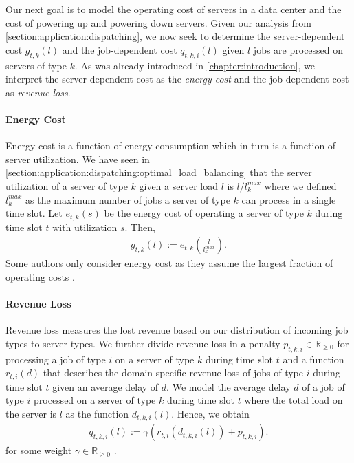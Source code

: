 Our next goal is to model the operating cost of servers in a data center and the cost of powering up and powering down servers. Given our analysis from \autoref{section:application:dispatching}, we now seek to determine the server-dependent cost $g_{t,k}(l)$ and the job-dependent cost $q_{t,k,i}(l)$ given $l$ jobs are processed on servers of type $k$. As was already introduced in \autoref{chapter:introduction}, we interpret the server-dependent cost as the \textit{energy cost} and the job-dependent cost as \textit{revenue loss}.

\paragraph{Energy Cost} Energy cost is a function of energy consumption which in turn is a function of server utilization. We have seen in \autoref{section:application:dispatching:optimal_load_balancing} that the server utilization of a server of type $k$ given a server load $l$ is $l / l_k^{max}$ where we defined $l_k^{max}$ as the maximum number of jobs a server of type $k$ can process in a single time slot. Let $e_{t,k}(s)$ be the energy cost of operating a server of type $k$ during time slot $t$ with utilization $s$. Then, \begin{align*}
    g_{t,k}(l) := e_{t,k}\left(\frac{l}{l_k^{max}}\right).
\end{align*} Some authors only consider energy cost as they assume the largest fraction of operating costs \cite{Bansal2015}.

\paragraph{Revenue Loss} Revenue loss measures the lost revenue based on our distribution of incoming job types to server types. We further divide revenue loss in a penalty $p_{t,k,i} \in \mathbb{R}_{\geq 0}$ for processing a job of type $i$ on a server of type $k$ during time slot $t$ and a function $r_{t,i}(d)$ that describes the domain-specific revenue loss of jobs of type $i$ during time slot $t$ given an average delay of $d$. We model the average delay $d$ of a job of type $i$ processed on a server of type $k$ during time slot $t$ where the total load on the server is $l$ as the function $d_{t,k,i}(l)$. Hence, we obtain \begin{align*}
    q_{t,k,i}(l) := \gamma(r_{t,i}(d_{t,k,i}(l)) + p_{t,k,i}).
\end{align*} for some weight $\gamma \in \mathbb{R}_{\geq 0}$ \cite{Lin2011}.

